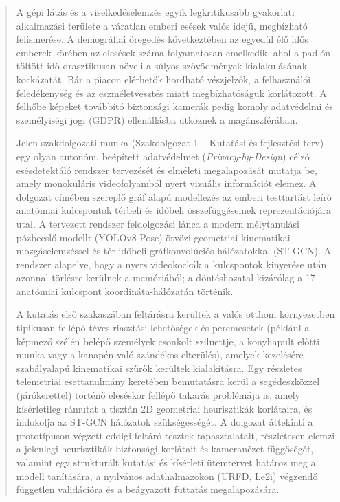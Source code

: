 \documentclass[12pt,a4paper,oneside]{report}
\begin{document}
\begin{abstract}
A gépi látás és a viselkedéselemzés egyik legkritikusabb gyakorlati alkalmazási területe a váratlan emberi esések valós idejű, megbízható felismerése. A demográfiai öregedés következtében az egyedül élő idős emberek körében az elesések száma folyamatosan emelkedik, ahol a padlón töltött idő drasztikusan növeli a súlyos szövődmények kialakulásának kockázatát. Bár a piacon elérhetők hordható vészjelzők, a felhasználói feledékenység és az eszméletvesztés miatt megbízhatóságuk korlátozott. A felhőbe képeket továbbító biztonsági kamerák pedig komoly adatvédelmi és személyiségi jogi (GDPR) ellenállásba ütköznek a magánszférában.

Jelen szakdolgozati munka (Szakdolgozat 1 -- Kutatási és fejlesztési terv) egy olyan autonóm, beépített adatvédelmet (\textit{Privacy-by-Design}) célzó esésdetektáló rendszer tervezését és elméleti megalapozását mutatja be, amely monokuláris videofolyamból nyert vizuális információt elemez. A dolgozat címében szereplő gráf alapú modellezés az emberi testtartást leíró anatómiai kulcspontok térbeli és időbeli összefüggéseinek reprezentációjára utal. A tervezett rendszer feldolgozási lánca a modern mélytanulási pózbecslő modellt (YOLOv8-Pose) ötvözi geometriai-kinematikai mozgáselemzéssel és tér-időbeli gráfkonvolúciós hálózatokkal (ST-GCN). A rendszer alapelve, hogy a nyers videokockák a kulcspontok kinyerése után azonnal törlésre kerülnek a memóriából; a döntéshozatal kizárólag a 17 anatómiai kulcspont koordináta-hálózatán történik.

A kutatás első szakaszában feltárásra kerültek a valós otthoni környezetben tipikusan fellépő téves riasztási lehetőségek és peremesetek (például a képmező szélén belépő személyek csonkolt sziluettje, a konyhapult előtti munka vagy a kanapén való szándékos elterülés), amelyek kezelésére szabályalapú kinematikai szűrők kerültek kialakításra. Egy részletes telemetriai esettanulmány keretében bemutatásra kerül a segédeszközzel (járókerettel) történő eleséskor fellépő takarás problémája is, amely kísérletileg rámutat a tisztán 2D geometriai heurisztikák korlátaira, és indokolja az ST-GCN hálózatok szükségességét. A dolgozat áttekinti a prototípuson végzett eddigi feltáró tesztek tapasztalatait, részletesen elemzi a jelenlegi heurisztikák biztonsági korlátait és kameranézet-függőségét, valamint egy strukturált kutatási és kísérleti ütemtervet határoz meg a modell tanítására, a nyilvános adathalmazokon (URFD, Le2i) végzendő független validációra és a beágyazott futtatás megalapozására.
\end{abstract}
\end{document}

